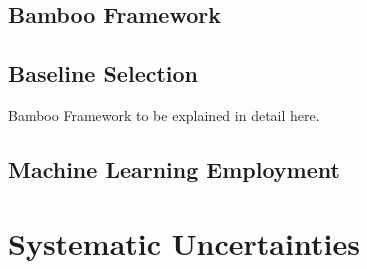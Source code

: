 \subsection{Bamboo Framework}

\subsection{Baseline Selection}

Bamboo Framework to be explained in detail here.

\subsection{Machine Learning Employment}

\section{Systematic Uncertainties}

